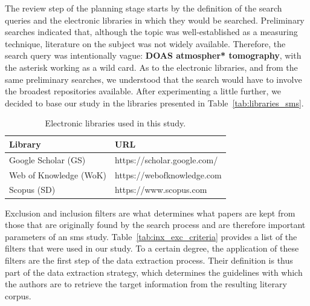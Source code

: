 The review step of the planning stage starts by the definition of the
search queries and the electronic libraries in which they would be
searched.  Preliminary searches indicated that, although the topic was
well-established as a measuring technique, literature on the subject was
not widely available. Therefore, the search query was intentionally
vague: \textbf{DOAS atmospher* tomography}, with the asterisk working as
a wild card. As to the electronic libraries, and from the same
preliminary searches, we understood that the search would have to
involve the broadest repositories available. After experimenting a
little further, we decided to base our study in the libraries presented
in Table~\ref{tab:libraries_sms}.

\begin{table}[htb]
\centering
\caption{Electronic libraries used in this study.}
\label{tab:libraries}
    \begin{tabularx}{\textwidth}{ll}
        \toprule
        \textbf{Library}          & \textbf{URL}\\
        \midrule
        Google Scholar (GS)   & https://scholar.google.com/\\
        Web of Knowledge (WoK)& https://webofknowledge.com\\
        Scopus (SD)   & https://www.scopus.com\\
        \bottomrule
    \end{tabularx}
\end{table}

Exclusion and inclusion filters are what determines what papers are kept
from those that are originally found by the search process and are
therefore important parameters of an \gls{sms} study.
Table~\ref{tab:inx_exc_criteria} provides a list of the filters that were
used in our study. To a certain degree, the application of these filters
are the first step of the data extraction process. Their definition is
thus part of the data extraction strategy, which determines the
guidelines with which the authors are to retrieve the target information
from the resulting literary corpus.

